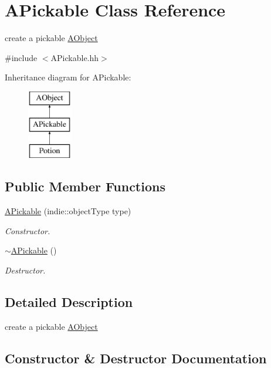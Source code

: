 \hypertarget{classAPickable}{}\section{A\+Pickable Class Reference}
\label{classAPickable}


create a pickable \hyperlink{classAObject}{A\+Object}  




{\ttfamily \#include $<$A\+Pickable.\+hh$>$}

Inheritance diagram for A\+Pickable\+:\begin{figure}[H]
\begin{center}
\leavevmode
\includegraphics[height=3.000000cm]{classAPickable}
\end{center}
\end{figure}
\subsection*{Public Member Functions}
\begin{DoxyCompactItemize}
\item 
\hyperlink{classAPickable_a6be5419f2699d070f6e41c29deca6272}{A\+Pickable} (indie\+::object\+Type type)
\begin{DoxyCompactList}\small\item\em Constructor. \end{DoxyCompactList}\item 
\hyperlink{classAPickable_a145013963070158596ad2e0d07065f5d}{$\sim$\+A\+Pickable} ()
\begin{DoxyCompactList}\small\item\em Destructor. \end{DoxyCompactList}\end{DoxyCompactItemize}


\subsection{Detailed Description}
create a pickable \hyperlink{classAObject}{A\+Object} 

\subsection{Constructor \& Destructor Documentation}
\mbox{\label{classAPickable_a6be5419f2699d070f6e41c29deca6272}} 
